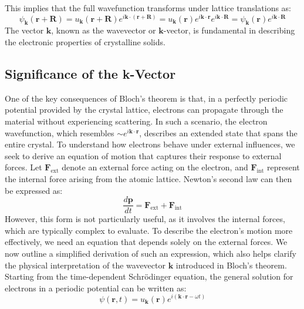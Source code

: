This implies that the full wavefunction transforms under lattice translations as:
\begin{equation*}
	\psi_{\mathbf{k}}(\mathbf{r} + \mathbf{R}) = u_{\mathbf{k}}(\mathbf{r} + \mathbf{R}) e^{i\mathbf{k} \cdot (\mathbf{r} + \mathbf{R})} = u_{\mathbf{k}}(\mathbf{r}) e^{i\mathbf{k} \cdot \mathbf{r}} e^{i\mathbf{k} \cdot \mathbf{R}} = \psi_{\mathbf{k}}(\mathbf{r}) e^{i\mathbf{k} \cdot \mathbf{R}}
\end{equation*}
The vector \( \mathbf{k} \), known as the wavevector or \( \mathbf{k} \)-vector, is fundamental in describing the electronic properties of crystalline solids.

\subsection{Significance of the k-Vector}
One of the key consequences of Bloch's theorem is that, in a perfectly periodic potential provided by the crystal lattice, electrons can propagate through the material without experiencing scattering. In such a scenario, the electron wavefunction, which resembles \( \sim e^{i\mathbf{k} \cdot \mathbf{r}} \), describes an extended state that spans the entire crystal.
To understand how electrons behave under external influences, we seek to derive an equation of motion that captures their response to external forces. Let \( \mathbf{F}_{\text{ext}} \) denote an external force acting on the electron, and \( \mathbf{F}_{\text{int}} \) represent the internal force arising from the atomic lattice. Newton’s second law can then be expressed as:
\begin{equation*}
	\frac{d\mathbf{p}}{dt} = \mathbf{F}_{\text{ext}} + \mathbf{F}_{\text{int}}
\end{equation*}
\noindent However, this form is not particularly useful, as it involves the internal forces, which are typically complex to evaluate. To describe the electron's motion more effectively, we need an equation that depends solely on the external forces. We now outline a simplified derivation of such an expression, which also helps clarify the physical interpretation of the wavevector \( \mathbf{k} \) introduced in Bloch’s theorem.
Starting from the time-dependent Schrödinger equation, the general solution for electrons in a periodic potential can be written as:
\begin{equation*}
	\psi(\mathbf{r}, t) = u_{\mathbf{k}}(\mathbf{r}) e^{i(\mathbf{k} \cdot \mathbf{r} - \omega t)}
\end{equation*}
